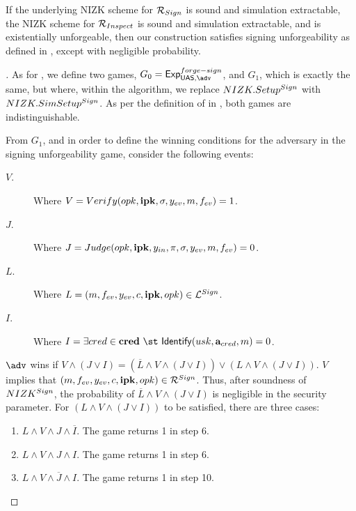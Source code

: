 \begin{theorem}
  \label{thm:sign-forge-uas}
  If the underlying NIZK scheme for $\mathcal{R}_{Sign}$ is sound and simulation
  extractable, the NIZK scheme for $\mathcal{R}_{Inspect}$ is sound and simulation
  extractable, and \SBCM is existentially unforgeable, then our \CUASGen
  construction satisfies signing unforgeability as defined in
  , except with negligible probability.
\end{theorem}

\begin{proof}[]
  As for , we define two games, $G_0=\ExpForgeSign$,
  and $G_1$, which is exactly the same, but where, within the \Setup algorithm,
  we replace $NIZK.Setup^{Sign}$ with $NIZK.SimSetup^{Sign}$. As per the
  definition of \NIZK in , both games are indistinguishable.

  From $G_1$, and in order to define the winning conditions for the adversary
  in the signing unforgeability game, consider the following events:

  \begin{description}
  \item[$V$.] Where $V = Verify(opk,\mathbf{ipk},\sigma,y_{ev},m,f_{ev}) = 1$.
  \item[$J$.] Where $J = Judge(opk,\mathbf{ipk},y_{in},\pi,\sigma,y_{ev},m,
    f_{ev}) = 0$.
  \item[$L$.] Where $L = (m,f_{ev},y_{ev},c,\mathbf{ipk},opk) \in
    \mathcal{L}^{Sign}$.    
  \item[$I$.] Where $I = \exists \cred \in \scred~\st~\Identify(\usk,
    \attrs_{\cred},\msg) = 0$.
  \end{description}

  $\adv$ wins if $V \land (J \lor I) = (\overline{L} \land V \land (J \lor I))
  \lor (L \land V \land (J \lor I))$.
  $V$ implies that $(m,f_{ev},y_{ev},c,\mathbf{ipk},opk) \in \mathcal{R}^{Sign}$.
  Thus, after soundness of $NIZK^{Sign}$, the probability of $\overline{L}
  \land V \land (J \lor I)$ is negligible in the security parameter.
  For $(L \land V \land (J \lor I))$ to be satisfied, there are three cases:
  \begin{enumerate}
  \item $L \land V \land J \land \overline{I}$. The game returns 1 in step 6.
  \item $L \land V \land J \land I$.  The game returns 1 in step 6.
  \item $L \land V \land \overline{J} \land I$. The game returns 1 in step 10. 
  \end{enumerate}


\end{proof}

